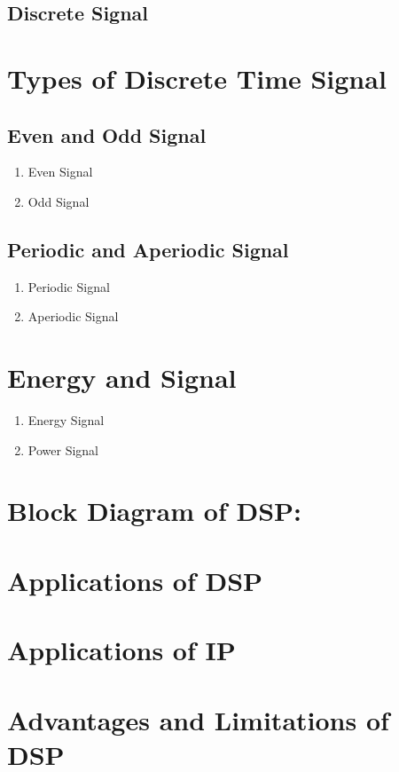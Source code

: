 \documentclass{article}
\begin{document}
\begin{multicols}{2}
        \subsection{Discrete Signal}
    \section{Types of Discrete Time Signal}
        \subsection{Even and Odd Signal}
            \begin{enumerate}
                \item Even Signal
                \item Odd Signal
            \end{enumerate}
        \subsection{Periodic and Aperiodic Signal}
            \begin{enumerate}
                \item Periodic Signal
                \item Aperiodic Signal
            \end{enumerate}
    \section{Energy and Signal}
        \begin{enumerate}
            \item Energy Signal
            \item Power Signal
        \end{enumerate}
    \section{Block Diagram of DSP:}
    \section{Applications of DSP}
    \section{Applications of IP} 
    \section{Advantages and Limitations of DSP}

\end{multicols}
\end{document}

